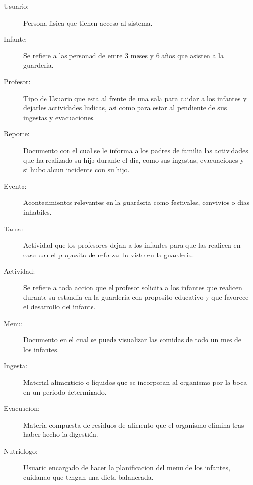 \begin{description}
	\item[\hypertarget{tusuario}{Usuario:}] Persona fisica que tienen acceso al sistema. 
 
	\item[\hypertarget{tinfante}{Infante:}] Se refiere a las personad de entre 3 meses y 6 años que asisten a la guarderia.
	
	\item[\hypertarget{tDocente}{Profesor:}] Tipo de Usuario que esta al frente de una sala para cuidar a los infantes y dejarles actividades ludicas, asi como para estar al pendiente de sus ingestas y evacuaciones.
 
	\item[\hypertarget{treporte}{Reporte:}] Documento con el cual se le informa a los padres de familia las actividades que ha realizado su hijo durante el dia, como sus ingestas, evacuaciones y si hubo alcun incidente con su hijo.
	
	\item[\hypertarget{tEvento}{Evento:}] Acontecimientos relevantes en la guarderia como festivales, convivios o dias inhabiles.
	
	\item[\hypertarget{ttarea}{Tarea:}] Actividad que los profesores dejan a los infantes para que las realicen en casa con el proposito de reforzar lo visto en la guarderia. 

	\item[\hypertarget{tactividad}{Actividad:}] Se refiere a toda accion que el profesor solicita a los infantes que realicen durante su estandia en la guarderia con proposito educativo y que favorece el desarrollo del infante.
	
	\item[\hypertarget{tMenu}{Menu:}] Documento en el cual se puede visualizar las comidas de todo un mes de los infantes.

        \item[\hypertarget{tIngesta}{Ingesta:}] Material alimenticio o líquidos que se incorporan al organismo por la boca en un periodo determinado.

        \item[\hypertarget{tEvacuacion}{Evacuacion:}] Materia compuesta de residuos de alimento que el organismo elimina tras haber hecho la digestión.
        
        \item[\hypertarget{tNutriologo}{Nutriologo:}] Usuario encargado de hacer la planificacion del menu de los infantes, cuidando que tengan una dieta balanceada.
        

\end{description}
